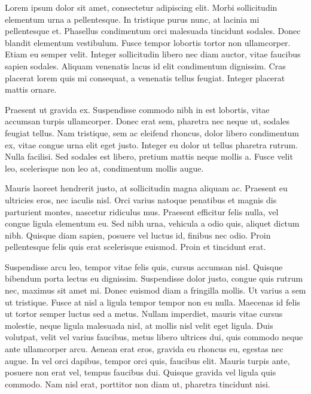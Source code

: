 \documentclass{homework}
\begin{document}
Lorem ipsum dolor sit amet, consectetur adipiscing elit. Morbi sollicitudin elementum urna a pellentesque. In tristique purus nunc, at lacinia mi pellentesque et. Phasellus condimentum orci malesuada tincidunt sodales. Donec blandit elementum vestibulum. Fusce tempor lobortis tortor non ullamcorper. Etiam eu semper velit. Integer sollicitudin libero nec diam auctor, vitae faucibus sapien sodales. Aliquam venenatis lacus id elit condimentum dignissim. Cras placerat lorem quis mi consequat, a venenatis tellus feugiat. Integer placerat mattis ornare.

Praesent ut gravida ex. Suspendisse commodo nibh in est lobortis, vitae accumsan turpis ullamcorper. Donec erat sem, pharetra nec neque ut, sodales feugiat tellus. Nam tristique, sem ac eleifend rhoncus, dolor libero condimentum ex, vitae congue urna elit eget justo. Integer eu dolor ut tellus pharetra rutrum. Nulla facilisi. Sed sodales est libero, pretium mattis neque mollis a. Fusce velit leo, scelerisque non leo at, condimentum mollis augue.

Mauris laoreet hendrerit justo, at sollicitudin magna aliquam ac. Praesent eu ultricies eros, nec iaculis nisl. Orci varius natoque penatibus et magnis dis parturient montes, nascetur ridiculus mus. Praesent efficitur felis nulla, vel congue ligula elementum eu. Sed nibh urna, vehicula a odio quis, aliquet dictum nibh. Quisque diam sapien, posuere vel luctus id, finibus nec odio. Proin pellentesque felis quis erat scelerisque euismod. Proin et tincidunt erat.

Suspendisse arcu leo, tempor vitae felis quis, cursus accumsan nisl. Quisque bibendum porta lectus eu dignissim. Suspendisse dolor justo, congue quis rutrum nec, maximus sit amet mi. Donec euismod diam a fringilla mollis. Ut varius a sem ut tristique. Fusce at nisl a ligula tempor tempor non eu nulla. Maecenas id felis ut tortor semper luctus sed a metus. Nullam imperdiet, mauris vitae cursus molestie, neque ligula malesuada nisl, at mollis nisl velit eget ligula. Duis volutpat, velit vel varius faucibus, metus libero ultrices dui, quis commodo neque ante ullamcorper arcu. Aenean erat eros, gravida eu rhoncus eu, egestas nec augue. In vel orci dapibus, tempor orci quis, faucibus elit. Mauris turpis ante, posuere non erat vel, tempus faucibus dui. Quisque gravida vel ligula quis commodo. Nam nisl erat, porttitor non diam ut, pharetra tincidunt nisi.
\end{document}
